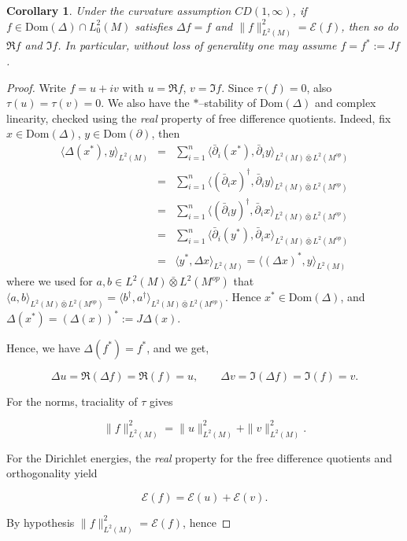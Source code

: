 \documentclass[10pt,a4paper,reqno]{amsart}
\newtheorem{corollary}[theorem]{Corollary}
\newcommand{\Dom}{\mathrm{Dom}}
\begin{document}
\begin{corollary}\label{cor1}
Under the curvature assumption $CD(1,\infty)$, if $f\in \Dom(\Delta)\cap L^2_0(M)$ satisfies $\Delta f=f$ and $\|f\|_{L^2(M)}^2=\mathcal{E}(f)$, then so do $\Re f$ and $\Im f$. In particular, without loss of generality one may assume $f=f^\ast:=Jf$.
\end{corollary}

\begin{proof}
Write $f=u+iv$ with $u=\Re f$, $v=\Im f$. Since $\tau(f)=0$, also $\tau(u)=\tau(v)=0$.  
We also have the $\ast$–stability of $\Dom(\Delta)$ and complex linearity, checked using the \emph{real} property of free difference quotients. Indeed, fix $x\in \Dom(\Delta)$, $y\in \Dom( \partial)$, then
\begin{eqnarray}
    \langle \Delta (x^*),y\rangle_{L^2(M)}&=&\sum_{i=1}^n \langle \bar \partial_i (x^*),\bar\partial_i y\rangle_{L^2(M)\bar\otimes L^2(M^{op})}\nonumber\\
    &=&\sum_{i=1}^n \langle (\bar \partial_i x)^{\dagger},\bar\partial_i y\rangle_{L^2(M)\bar\otimes L^2(M^{op})}\nonumber\\
    &=& \sum_{i=1}^n \langle (\bar \partial_i y)^{\dagger},\bar\partial_i x\rangle_{L^2(M)\bar\otimes L^2(M^{op})}\nonumber\\
    &=& \sum_{i=1}^n \langle \bar \partial_i (y^*),\bar\partial_i x\rangle_{L^2(M)\bar\otimes L^2(M^{op})}\nonumber\\
    &=& \langle y^*,\Delta x\rangle_{L^2(M)}=\langle (\Delta x)^*,y\rangle_{L^2(M)}
\end{eqnarray}
where we used for $a,b\in L^2(M)\bar\otimes L^2(M^{op})$ that $\langle a,b\rangle_{L^2(M)\bar\otimes L^2(M^{op})}=\langle b^{\dagger},a^{\dagger}\rangle_{L^2(M)\bar\otimes L^2(M^{op})}$. Hence $x^*\in \Dom(\Delta)$, and $\Delta(x^*)=(\Delta(x))^*:=J\Delta(x)$.
\bigbreak

Hence, we have $\Delta(f^*)=f^*$, and we get,

\[
\Delta u=\Re(\Delta f)=\Re(f)=u,\qquad
\Delta v=\Im(\Delta f)=\Im(f)=v.
\]


For the norms, traciality of $\tau$ gives


\[
\|f\|_{L^2(M)}^2=\|u\|_{L^2(M)}^2+\|v\|_{L^2(M)}^2.
\]


For the Dirichlet energies, the \emph{real} property for the free difference quotients and orthogonality yield


\[
\mathcal{E}(f)=\mathcal{E}(u)+\mathcal{E}(v).
\]


By hypothesis $\|f\|^2_{L^2(M)}=\mathcal{E}(f)$, hence



\end{proof}
\end{document}
